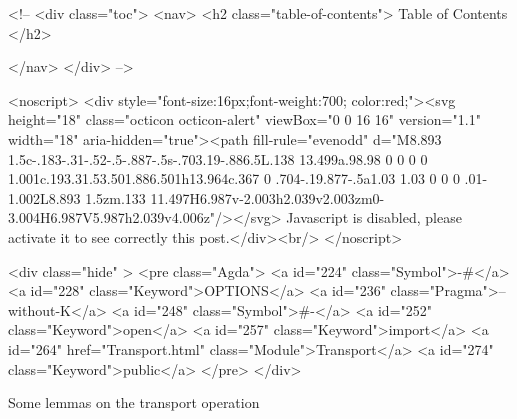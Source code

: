   <!-- 
  <div class="toc">
    <nav>
    <h2 class="table-of-contents"> Table of Contents </h2>
      

    </nav>
  </div>
   -->

  <noscript>
  <div style="font-size:16px;font-weight:700; color:red;"><svg height="18" class="octicon octicon-alert" viewBox="0 0 16 16" version="1.1" width="18" aria-hidden="true"><path fill-rule="evenodd" d="M8.893 1.5c-.183-.31-.52-.5-.887-.5s-.703.19-.886.5L.138 13.499a.98.98 0 0 0 0 1.001c.193.31.53.501.886.501h13.964c.367 0 .704-.19.877-.5a1.03 1.03 0 0 0 .01-1.002L8.893 1.5zm.133 11.497H6.987v-2.003h2.039v2.003zm0-3.004H6.987V5.987h2.039v4.006z"/></svg> Javascript is disabled, please activate it to see correctly this post.</div><br/>
  </noscript>

  <div class="hide" >
<pre class="Agda">
<a id="224" class="Symbol">{-#</a> <a id="228" class="Keyword">OPTIONS</a> <a id="236" class="Pragma">--without-K</a> <a id="248" class="Symbol">#-}</a>
<a id="252" class="Keyword">open</a> <a id="257" class="Keyword">import</a> <a id="264" href="Transport.html" class="Module">Transport</a> <a id="274" class="Keyword">public</a>
</pre>
</div>

Some lemmas on the transport operation

